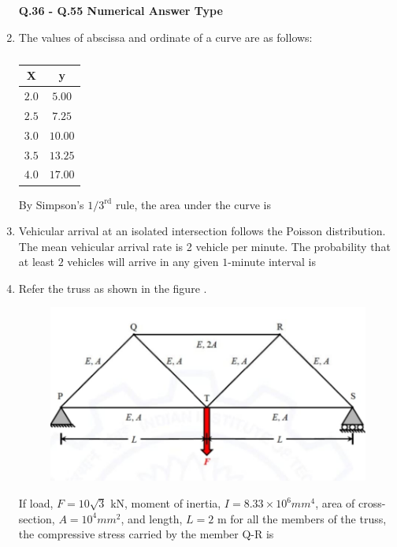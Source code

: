 \documentclass[journal,12pt,onecolumn]{article}
\theoremstyle{remark}
\begin{document}
\begin{enumerate}
\textbf{Q.36 - Q.55 Numerical Answer Type}
\item The values of abscissa  and ordinate  of a curve are as follows:
\begin{table}[H]
    \centering
    \begin{tabular}{|c|c|}
    \hline
    \textbf{X} & \textbf{y} \\
    \hline
    $2.0$ & $5.00$ \\
    \hline
    $2.5$ & $7.25$ \\
    \hline
    $3.0$ & $10.00$ \\
    \hline
    $3.5$ & $13.25$ \\
    \hline
    $4.0$ & $17.00$ \\
    \hline
    \end{tabular}
    \caption{}
    \label{tab:q36}
\end{table}
By Simpson's $1/3^{\text{rd}}$ rule, the area under the curve  is \underline{\hspace{2cm}}

\hfill{}

\item Vehicular arrival at an isolated intersection follows the Poisson distribution. The mean vehicular arrival rate is 2 vehicle per minute. The probability  that at least $2$ vehicles will arrive in any given $1$-minute interval is \underline{\hspace{2cm}}

\hfill{}

\item Refer the truss as shown in the figure  .
\begin{figure}[H]
    \centering
    \includegraphics[width=0.7\columnwidth]{figs/1q38.jpg}
    \caption{}
    \label{fig:q38}
\end{figure}
If load, $F = 10\sqrt{3}$ kN, moment of inertia, $I = 8.33 \times 10^6 mm^4$, area of cross-section, $A = 10^4 mm^2$, and length, $L = 2$ m for all the members of the truss, the compressive stress  carried by the member Q-R is \underline{\hspace{2cm}}


\end{enumerate}
\end{document}
